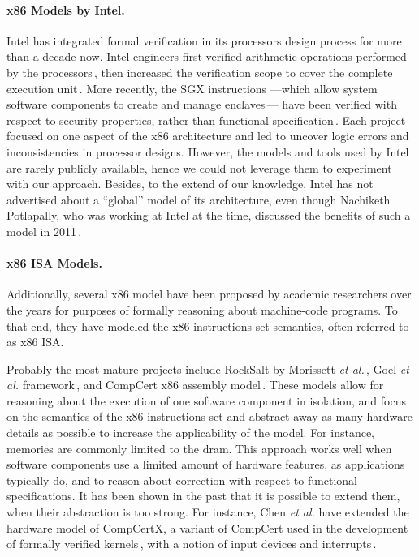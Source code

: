 \paragraph{x86 Models by Intel.}
%
Intel has integrated formal verification in its processors design process for
more than a decade now.
%
Intel engineers first verified arithmetic operations performed by the
processors\,\cite{harrison2000x86}, then increased the verification scope to
cover the complete execution unit\,\cite{kaivola2009formalintel}.
%
More recently, the SGX instructions ---which allow system software components to
create and manage enclaves\,\cite{costan2016sgxexplained}--- have been verified
with respect to security properties, rather than functional
specification\,\cite{leslie2015linsgx}.
%
Each project focused on one aspect of the x86 architecture and led to uncover
logic errors and inconsistencies in processor designs.
%
However, the models and tools used by Intel are rarely publicly available, hence
we could not leverage them to experiment with our approach.
%
Besides, to the extend of our knowledge, Intel has not advertised about a
``global'' model of its architecture, even though Nachiketh Potlapally, who was
working at Intel at the time, discussed the benefits of such a model in
2011\,\cite{potlapally2011hardwaresecurity}.
%

\paragraph{x86 ISA Models.}
%
Additionally, several x86 model have been proposed by academic researchers over
the years for purposes of formally reasoning about machine-code programs.
%
To that end, they have modeled the x86 instructions set semantics, often
referred to as x86 ISA.

Probably the most mature projects include RockSalt by Morissett \emph{et
  al.}\,\cite{morrisett2012rocksalt}, Goel \emph{et al.}
framework\,\cite{goel2014x86}, and CompCert x86 assembly
model\,\cite{leroy2012compcert}.
%
These models allow for reasoning about the execution of one software component
in isolation, and focus on the semantics of the x86 instructions set and
abstract away as many hardware details as possible to increase the applicability
of the model.
%
For instance, memories are commonly limited to the \ac{dram}.
%
This approach works well when software components use a limited amount of
hardware features, as applications typically do, and to reason about correction
with respect to functional specifications.
%
It has been shown in the past that it is possible to extend them, when their
abstraction is too strong.
%
For instance, Chen \emph{et al.} have extended the hardware model of CompCertX,
a variant of CompCert used in the development of formally verified
kernels\,\cite{gu2016certikos}, with a notion of input devices and
interrupts\,\cite{chen2018interrupt}.

